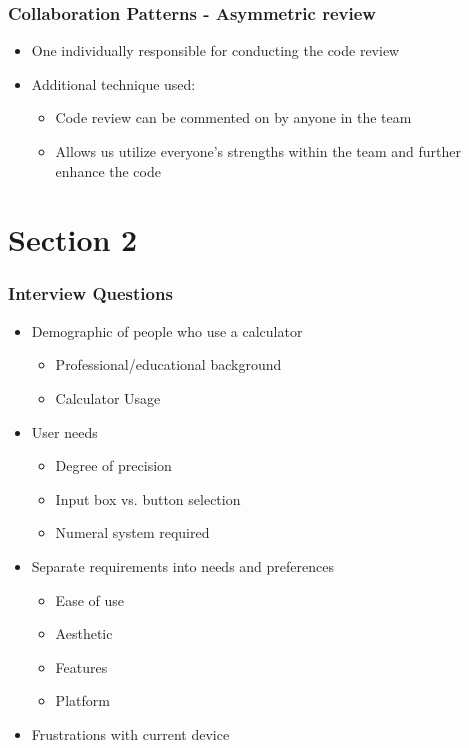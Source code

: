 \documentclass{beamer}
\begin{document}
  \begin{frame}
  \frametitle{Collaboration Patterns - Asymmetric review}
  \begin{itemize}
   \item One individually responsible for conducting the code review
   \item Additional technique used:
    \begin{itemize}
     \item Code review can be commented on by anyone in the team
     \item Allows us utilize everyone's strengths within the team and further enhance the code
    \end{itemize}
  \end{itemize}
  \end{frame}



  \section{Section 2}

  \begin{frame}
  \frametitle{Interview Questions}
  \begin{itemize}
   \item Demographic of people who use a calculator
    \begin{itemize}
     \item Professional/educational background
     \item Calculator Usage
    \end{itemize}
   \item User needs
    \begin{itemize}
     \item Degree of precision
     \item Input box vs. button selection
     \item Numeral system required
    \end{itemize}
   \item Separate requirements into needs and preferences
    \begin{itemize}
     \item Ease of use
     \item Aesthetic
     \item Features
     \item Platform
    \end{itemize}
     \item Frustrations with current device
  \end{itemize}
  \end{frame}
\end{document}
